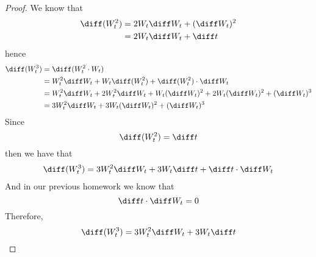 \begin{subproblem}[(\arabic*).]
        \item
        \begin{proof}
            We know that
            \[\begin{aligned}
                \diff (W_t^2)&=2W_t\diff W_t+(\diff W_t)^2\\
                &=2W_t\diff W_t+\diff t
            \end{aligned}\]
            hence
            \[\begin{aligned}
                \diff(W_t^3)&=\diff(W_t^2\cdot W_t)\\
                &=W_t^2\diff W_t+W_t\diff(W_t^2)+\diff(W_t^2)\cdot\diff W_t\\
                &=W_t^2\diff W_t
                +2W_t^2\diff W_t+W_t(\diff W_t)^2
                +2W_t(\diff W_t)^2+(\diff W_t)^3\\
                &=3W_t^2\diff W_t+3W_t(\diff W_t)^2+(\diff W_t)^3
            \end{aligned}\]
            Since
            \[\diff(W^2_t)=\diff t\]
            then we have that
            \[\begin{aligned}
                \diff(W_t^3)=3W_t^2\diff W_t+3W_t\diff t+\diff t\cdot\diff W_t
            \end{aligned}\]
            And in our previous homework we know that
            \[\diff t\cdot\diff W_t=0\]
            Therefore,
            \[\diff(W_t^3)=3W_t^2\diff W_t+3W_t\diff t\]
            \end{proof}
    \end{subproblem}


